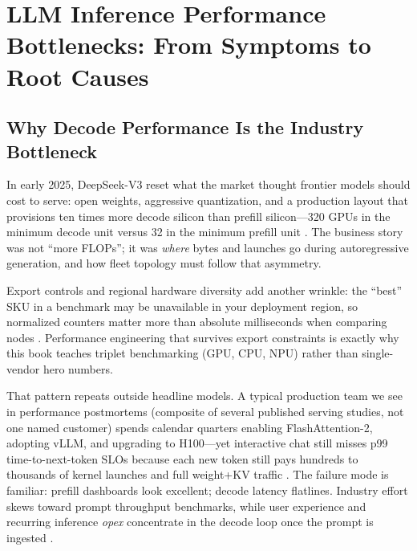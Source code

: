 \chapter{LLM Inference Performance Bottlenecks: From Symptoms to Root Causes}
\label{chap:decode_bottlenecks}

\section{Why Decode Performance Is the Industry Bottleneck}
\label{sec:industrial_hook}

In early 2025, DeepSeek-V3 reset what the market thought frontier models should cost to serve: open weights, aggressive quantization, and a production layout that provisions ten times more decode silicon than prefill silicon---320 GPUs in the minimum decode unit versus 32 in the minimum prefill unit \citep{patel2025llminference}.
The business story was not ``more FLOPs''; it was \emph{where} bytes and launches go during autoregressive generation, and how fleet topology must follow that asymmetry.

Export controls and regional hardware diversity add another wrinkle: the ``best'' SKU in a benchmark may be unavailable in your deployment region, so normalized counters matter more than absolute milliseconds when comparing nodes \citep{patel2025llminference,wang2025pdacca541tokenssll}.
Performance engineering that survives export constraints is exactly why this book teaches triplet benchmarking (GPU, CPU, NPU) rather than single-vendor hero numbers.


That pattern repeats outside headline models.
A typical production team we see in performance postmortems (composite of several published serving studies, not one named customer) spends calendar quarters enabling FlashAttention-2, adopting vLLM, and upgrading to H100---yet interactive chat still misses p99 time-to-next-token SLOs because each new token still pays hundreds to thousands of kernel launches and full weight+KV traffic \citep{taxbreak2026,memoryfloor2026,fan2025ellieenergyefficie}.
The failure mode is familiar: prefill dashboards look excellent; decode latency flatlines.
Industry effort skews toward prompt throughput benchmarks, while user experience and recurring inference \emph{opex} concentrate in the decode loop once the prompt is ingested \citep{wang2025pdacca541tokenssll,li2024llminferenceservin}.


